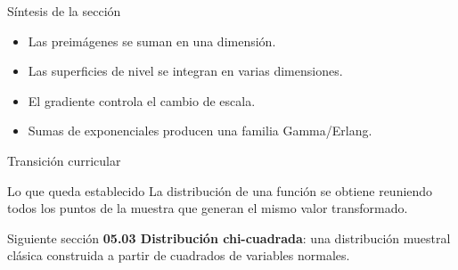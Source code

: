 \documentclass[10pt,aspectratio=169]{beamer}
\begin{document}
\begin{frame}{Síntesis de la sección}
  \footnotesize
  \begin{itemize}\itemsep=0.12cm
    \item Las preimágenes se suman en una dimensión.
    \item Las superficies de nivel se integran en varias dimensiones.
    \item El gradiente controla el cambio de escala.
    \item Sumas de exponenciales producen una familia Gamma/Erlang.
  \end{itemize}
\end{frame}

\begin{frame}{Transición curricular}
  \footnotesize
  \begin{block}{Lo que queda establecido}
    La distribución de una función se obtiene reuniendo todos los puntos de la
    muestra que generan el mismo valor transformado.
  \end{block}
  \begin{alertblock}{Siguiente sección}
    \textbf{05.03 Distribución chi-cuadrada}: una distribución muestral clásica
    construida a partir de cuadrados de variables normales.
  \end{alertblock}
\end{frame}
\end{document}
